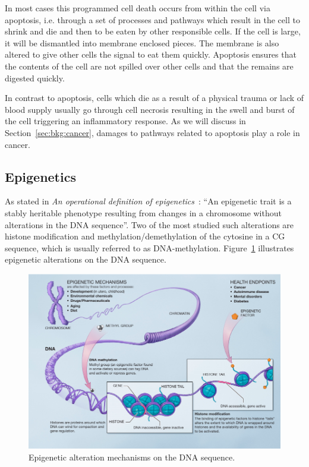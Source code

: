 In most cases this programmed cell death occurs from within the cell via apoptosis, i.e. through a set of processes and pathways which result in the cell to shrink and die and then to be eaten by other responsible cells. If the cell is large, it will be dismantled into membrane enclosed pieces. The membrane is also altered to give other cells the signal to eat them quickly. Apoptosis ensures that the contents of the cell are not spilled over other cells and that the remains are digested quickly.

In contrast to apoptosis, cells which die as a result of a physical trauma or lack of blood supply usually go through cell necrosis resulting in the swell and burst of the cell triggering an inflammatory response. As we will discuss in Section~\ref{sec:bkg:cancer}, damages to pathways related to apoptosis play a role in cancer.

\subsection{Epigenetics}
\label{sec:bkg:epigenetics}
As stated in \emph{An operational definition of epigenetics}~\cite{berger2009operational}: ``An epigenetic trait is a stably heritable phenotype resulting from changes in a chromosome without alterations in the DNA sequence''. Two of the most studied such alterations are histone modification and methylation/demethylation of the cytosine in a CG sequence, which is usually referred to as DNA-methylation. Figure~\ref{fig:bkg:epigenetics} illustrates epigenetic alterations on the DNA sequence.

\begin{figure}[!ht]
  \centering
  \includegraphics[width=1\textwidth]{figs/background/epigeneticmechanisms}
  \caption[Epigenetic alteration mechanisms on the DNA sequence.]{Epigenetic alteration mechanisms on the DNA sequence\protect\footnotemark.}
  \label{fig:bkg:epigenetics}
\end{figure}

